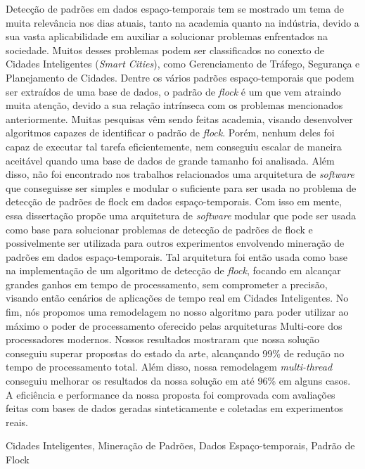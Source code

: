 Detecção de padrões em dados espaço-temporais tem se mostrado um tema de muita relevância nos dias atuais, tanto na
academia quanto na indústria, devido a sua vasta aplicabilidade em auxiliar a solucionar problemas enfrentados na
sociedade. Muitos desses problemas podem ser classificados no conexto de Cidades Inteligentes (\textit{Smart Cities}),
como Gerenciamento de Tráfego, Segurança e Planejamento de Cidades. Dentre os vários padrões espaço-temporais que podem
ser extraídos de uma base de dados, o padrão de \textit{flock} é um que vem atraindo muita atenção, devido a sua relação
intrínseca com os problemas mencionados anteriormente. Muitas pesquisas vêm sendo feitas academia, visando desenvolver
algoritmos capazes de identificar o padrão de \textit{flock}. Porém, nenhum deles foi capaz de executar tal tarefa
eficientemente, nem conseguiu escalar de maneira aceitável quando uma base de dados de grande tamanho foi analisada.
Além disso, não foi encontrado nos trabalhos relacionados uma arquitetura de \textit{software} que conseguisse ser
simples e modular o suficiente para ser usada no problema de detecção de padrões de flock em dados espaço-temporais.
Com isso em mente, essa dissertação propõe uma arquitetura de \textit{software} modular que pode ser usada como base
para solucionar problemas de detecção de padrões de flock e possivelmente ser utilizada para outros experimentos
envolvendo mineração de padrões em dados espaço-temporais. Tal arquitetura foi então usada como base na implementação de
um algoritmo de detecção de \textit{flock}, focando em alcançar grandes ganhos em tempo de processamento, sem
comprometer a precisão, visando então cenários de aplicações de tempo real em Cidades Inteligentes. No fim, nós propomos
uma remodelagem no nosso algoritmo para poder utilizar ao máximo o poder de processamento oferecido pelas arquiteturas
Multi-core dos processadores modernos. Nossos resultados mostraram que nossa solução conseguiu superar propostas do
estado da arte, alcançando 99\% de redução no tempo de processamento total. Além disso, nossa remodelagem
\textit{multi-thread} conseguiu melhorar os resultados da nossa solução em até 96\% em alguns casos. A eficiência e
performance da nossa proposta foi comprovada com avaliações feitas com bases de dados geradas sinteticamente e coletadas
em experimentos reais.

\begin{keywords}
Cidades Inteligentes, Mineração de Padrões, Dados Espaço-temporais, Padrão de Flock
\end{keywords}
